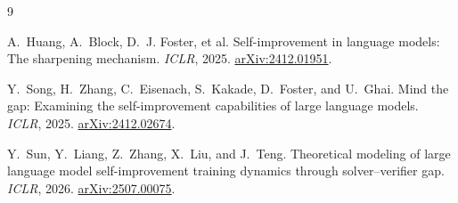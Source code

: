 \documentclass[10pt,twocolumn]{article}
\begin{document}
\begin{thebibliography}{9}\footnotesize

A.~Huang, A.~Block, D.~J. Foster, et al.
\newblock Self-improvement in language models: The sharpening mechanism.
\newblock \emph{ICLR}, 2025.
\href{https://arxiv.org/abs/2412.01951}{arXiv:2412.01951}.

Y.~Song, H.~Zhang, C.~Eisenach, S.~Kakade, D.~Foster, and U.~Ghai.
\newblock Mind the gap: Examining the self-improvement capabilities of large
language models.
\newblock \emph{ICLR}, 2025.
\href{https://arxiv.org/abs/2412.02674}{arXiv:2412.02674}.

Y.~Sun, Y.~Liang, Z.~Zhang, X.~Liu, and J.~Teng.
\newblock Theoretical modeling of large language model self-improvement
training dynamics through solver--verifier gap.
\newblock \emph{ICLR}, 2026.
\href{https://arxiv.org/abs/2507.00075}{arXiv:2507.00075}.

\end{thebibliography}
\end{document}
